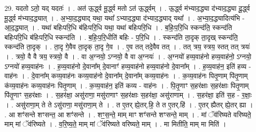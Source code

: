 \documentclass[17pt]{extarticle}
\begin{document}
29. यदतो ऽतो॒ यद् यदतः॑ । . अत॑ ऊ॒र्द्ध्व मू॒र्द्ध्व मतो ऽत॑ ऊ॒र्द्ध्वम् । . ऊ॒र्द्ध्व म॑भ्याद॒द्ध्या द॑भ्याद॒द्ध्या दू॒र्द्ध्व मू॒र्द्ध्व म॑भ्याद॒द्ध्यात् । . अ॒भ्या॒द॒द्ध्याद् यथा॒ यथा᳚ ऽभ्याद॒द्ध्या द॑भ्याद॒द्ध्याद् यथा᳚ । . अ॒भ्या॒द॒द्ध्यादित्य॑भि - आ॒द॒द्ध्यात् । . यथा॑ बहिःपरि॒धि ब॑हिःपरि॒धि यथा॒ यथा॑ बहिःपरि॒धि । . ब॒हिः॒प॒रि॒धि स्कन्द॑ति॒ स्कन्द॑ति बहिःपरि॒धि ब॑हिःपरि॒धि स्कन्द॑ति । . ब॒हिः॒प॒रि॒धीति॑ बहिः - प॒रि॒धि । . स्कन्द॑ति ता॒दृक् ता॒दृख् स्कन्द॑ति॒ स्कन्द॑ति ता॒दृक् । . ता॒दृ गे॒वैव ता॒दृक् ता॒दृ गे॒व । . ए॒व तत् तदे॒वैव तत् । . तत् त्रय॒ स्त्रय॒ स्तत् तत् त्रयः॑ । . त्रयो॒ वै वै त्रय॒ स्त्रयो॒ वै । . वा अ॒ग्नयो॒ ऽग्नयो॒ वै वा अ॒ग्नयः॑ । . अ॒ग्नयो॑ हव्य॒वाह॑नो हव्य॒वाह॑नो॒ ऽग्नयो॒ ऽग्नयो॑ हव्य॒वाह॑नः । . ह॒व्य॒वाह॑नो दे॒वाना᳚म् दे॒वानाꣳ॑ हव्य॒वाह॑नो हव्य॒वाह॑नो दे॒वाना᳚म् । . ह॒व्य॒वाह॑न॒ इति॑ हव्य - वाह॑नः । . दे॒वाना᳚म् कव्य॒वाह॑नः कव्य॒वाह॑नो दे॒वाना᳚म् दे॒वाना᳚म् कव्य॒वाह॑नः । . क॒व्य॒वाह॑नः पितृ॒णाम् पि॑तृ॒णाम् क॑व्य॒वाह॑नः कव्य॒वाह॑नः पितृ॒णाम् । . क॒व्य॒वाह॑न॒ इति॑ कव्य - वाह॑नः । . पि॒तृ॒णाꣳ स॒हर॑क्षाः स॒हर॑क्षाः पितृ॒णाम् पि॑तृ॒णाꣳ स॒हर॑क्षाः । . स॒हर॑क्षा॒ असु॑राणा॒ मसु॑राणाꣳ स॒हर॑क्षाः स॒हर॑क्षा॒ असु॑राणाम् । . स॒हर॑क्षा॒ इति॑ स॒ह - र॒क्षाः॒ । . असु॑राणा॒म् ते ते ऽसु॑राणा॒ मसु॑राणा॒म् ते । . त ए॒तर् ह्ये॒तर्.हि॒ ते त ए॒तर्.हि॑ । . ए॒तर् ह्यैतर् ह्ये॒तर् ह्या । . आ शꣳ॑सन्ते शꣳसन्त॒ आ शꣳ॑सन्ते । . शꣳ॒॒स॒न्ते॒ माम् माꣳ शꣳ॑सन्ते शꣳसन्ते॒ माम् । . मां ॅव॑रिष्यते वरिष्यते॒ माम् मां ॅव॑रिष्यते । . व॒रि॒ष्य॒ते॒ माम् मां ॅव॑रिष्यते वरिष्यते॒ माम् । . मा मितीति॒ माम् मा मिति॑ । \newline
\end{document}
